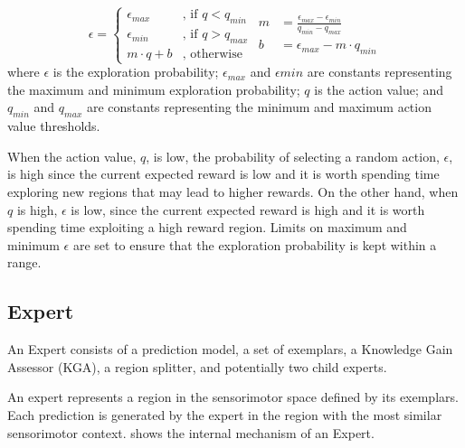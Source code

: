 \begin{subequations}\label{eqn:exploring_rate}
	\begin{equation}
		\epsilon = 
		\begin{cases}
			\epsilon_{max}  &\text{, if } q < q_{min} \\
			\epsilon_{min}  &\text{, if } q > q_{max} \\
			m \cdot q + b   &\text{, otherwise} 
		\end{cases}
	\end{equation}
	\begin{flalign}
		m &= \frac{\epsilon_{max} - \epsilon_{min}}{q_{min} - q_{max}} \\
		b &= \epsilon_{max} - m \cdot q_{min} 
	\end{flalign}
\end{subequations}
where $\epsilon$ is the exploration probability; $\epsilon_{max}$ and $\epsilon{min}$ are constants representing the maximum and minimum exploration probability; $q$ is the action value; and $q_{min}$ and $q_{max}$ are constants representing the minimum and maximum action value thresholds.

When the action value, $q$,  is low, the probability of selecting a random action, $\epsilon$, is high since the current expected reward is low and it is worth spending time exploring new regions that may lead to higher rewards. On the other hand, when $q$ is high, $\epsilon$ is low, since the current expected reward is high and it is worth spending time exploiting a high reward region. Limits on maximum and minimum $\epsilon$ are set to ensure that the exploration probability is kept within a range.

\subsection{Expert}

An Expert consists of a prediction model, a set of exemplars, a Knowledge Gain Assessor (KGA), a region splitter, and potentially two child experts. 

An expert represents a region in the sensorimotor space defined by its exemplars. Each prediction is generated by the expert in the region with the most similar sensorimotor context.  shows the internal mechanism of an Expert.

